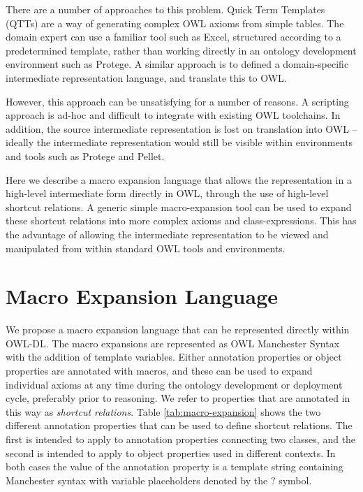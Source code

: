 \documentclass{llncs}
\begin{document}
There are a number of approaches to this problem. Quick Term Templates
(QTTs)\cite{QTT2009} are a way of generating complex OWL axioms from
simple tables. The domain expert can use a familiar tool such as
Excel, structured according to a predetermined template, rather than
working directly in an ontology development environment such as
Protege. A similar approach is to defined a domain-specific
intermediate representation language, and translate this to OWL.

However, this approach can be unsatisfying for a number of reasons. A
scripting approach is ad-hoc and difficult to integrate with existing
OWL toolchains. In addition, the source intermediate representation is
lost on translation into OWL -- ideally the intermediate representation
would still be visible within environments and tools such as
Protege and Pellet.



Here we describe a macro expansion language that allows the
representation in a high-level intermediate form directly in OWL,
through the use of high-level shortcut relations. A generic simple
macro-expansion tool can be used to expand these shortcut relations
into more complex axioms and class-expressions. This has the advantage
of allowing the intermediate representation to be viewed and
manipulated from within standard OWL tools and environments.




\section{Macro Expansion Language}

We propose a macro expansion language that can be represented directly
within OWL-DL. The macro expansions are represented as OWL Manchester
Syntax\cite{Horridge2006} with the addition of template
variables. Either annotation properties or object properties are
annotated with macros, and these can be used to expand individual
axioms at any time during the ontology development or deployment
cycle, preferably prior to reasoning. We refer to properties that are
annotated in this way as \emph{shortcut relations}.  Table
\ref{tab:macro-expansion} shows the two different annotation
properties that can be used to define shortcut relations. The first is
intended to apply to annotation properties connecting two classes, and
the second is intended to apply to object properties used in different
contexts. In both cases the value of the annotation property is a
template string containing Manchester syntax with variable
placeholders denoted by the $?$ symbol.
\end{document}
